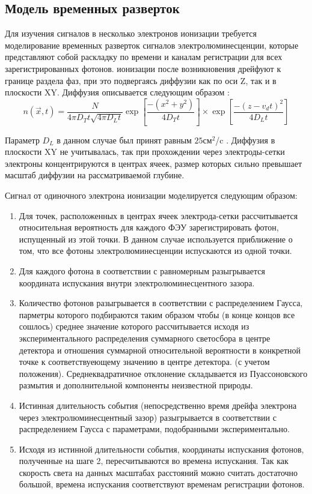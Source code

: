 \subsection{Модель временных разверток}
\label{subsect2_3_2}
Для изучения сигналов в несколько электронов ионизации требуется моделирование временных разверток сигналов электролюминесценции, которые представляют собой раскладку по времени и каналам регистрации для всех зарегистрированных фотонов. 
 ионизации после возникновения дрейфуют к границе раздела фаз, при это подвергаясь диффузии как по оси Z, так и в плоскости XY. Диффузия описывается следующим образом \cite{EXO-200:2016qyl}:
\begin{equation}
n(\vec{x}, t)=\frac{N}{4 \pi D_T t \sqrt{4 \pi D_L t}} \exp \left[\frac{-\left(x^2+y^2\right)}{4 D_T t}\right] \times \exp \left[\frac{-\left(z-v_d t\right)^2}{4 D_L t}\right]
\label{diffusion}
\end{equation}
\par Параметр $D_L$ в данном случае был принят равным $25 см^2$/c \cite{Njoya:2019ldm}.
Диффузия в плоскости XY не учитывалась, так при прохождении через электроды-сетки электроны концентрируются в центрах ячеек, размер которых сильно превышает масштаб диффузии на рассматриваемой глубине.
\par Сигнал от одиночного электрона ионизации моделируется следующим образом:
\begin{enumerate}
    \item Для точек, расположенных в центрах ячеек электрода-сетки рассчитывается относительная вероятность для каждого ФЭУ зарегистрировать фотон, испущенный из этой точки. В данном случае используется приближение о том, что все фотоны электролюминесценции испускаются из одной точки. 
    \item Для каждого фотона в соответствии с равномерным разыгрывается координата испускания внутри электролюминесцентного зазора.
    \item Количество фотонов разыгрывается в соответствии с распределением Гаусса, парметры которого подбираются таким образом чтобы (в конце концов все сошлось) среднее значение которого рассчитывается исходя из экспериментального распределения суммарного светосбора в центре детектора и отношения суммарной относительной вероятности в конкретной точке к соответствуеющему значению в центре детектора. (с учетом положения). Среднеквадратичное отклонение складывается из Пуассоновского размытия и дополнительной компоненты неизвестной природы.
    \item Истинная длительность события (непосредственно время дрейфа электрона через электролюминесцентный зазор) разыгрывается в соответствии с распределением Гаусса с параметрами, подобранными экспериментально. 
    \item Исходя из истинной длительности события, координаты испускания фотонов, полученные на шаге 2, пересчитываются во времена испускания. Так как скорость света на данных масштабах расстояний можно считать достаточно большой, времена испускания соответствуют временам регистрации фотонов.
\end{enumerate}

